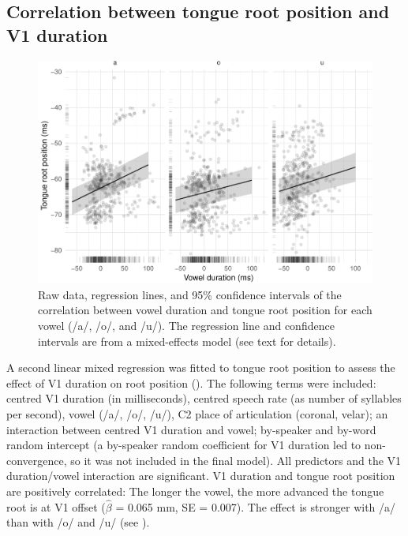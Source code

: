 \documentclass[12pt,]{article}
\begin{document}
\hypertarget{correlation-between-tongue-root-position-and-v1-duration}{%
\subsection{Correlation between tongue root position and V1
duration}\label{correlation-between-tongue-root-position-and-v1-duration}}

\label{s:trp-vdur}

\begin{figure}
\includegraphics[width=\linewidth]{2018-tra_files/figure-latex/tra-lm-2-plot-1} \caption{Raw data, regression lines, and 95\% confidence intervals of the correlation between vowel duration and tongue root position for each vowel (/a/, /o/, and /u/). The regression line and confidence intervals are from a mixed-effects model (see text for details).}\label{f:tra-lm-2-plot}
\end{figure}

A second linear mixed regression was fitted to tongue root position to
assess the effect of V1 duration on root position
(). The following terms were included: centred
V1 duration (in milliseconds), centred speech rate (as number of
syllables per second), vowel (/a/, /o/, /u/), C2 place of articulation
(coronal, velar); an interaction between centred V1 duration and vowel;
by-speaker and by-word random intercept (a by-speaker random coefficient
for V1 duration led to non-convergence, so it was not included in the
final model). All predictors and the V1 duration/vowel interaction are
significant. V1 duration and tongue root position are positively
correlated: The longer the vowel, the more advanced the tongue root is
at V1 offset (\(\hat{\beta}\) = 0.065 mm, SE = 0.007). The effect is
stronger with /a/ than with /o/ and /u/ (see ).
\end{document}

